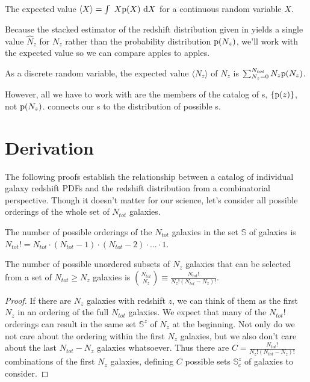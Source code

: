 \begin{definition}\label{def:expected}
	The expected value $\langle X \rangle = \int\ X\mathrm{p}(X)\ \mathrm{d} X$ for a continuous random variable $X$.
\end{definition}

Because the stacked estimator of the redshift distribution given in  yields a single value $\hat{N}_{z}$ for $N_{z}$ rather than the probability distribution $\mathrm{p}(N_{z})$, we'll work with the expected value so we can compare apples to apples.

\begin{lemma}\label{lem:expectednz}
	As a discrete random variable, the expected value $\langle N_{z} \rangle$ of $N_{z}$ is $\sum_{N_{z} = 0}^{N_{tot}} N_{z}\mathrm{p}(N_{z})$.
\end{lemma}

However, all we have to work with are the members of the catalog of \pzpdf s, $\{\mathrm{p}(z)\}$, not $\mathrm{p}(N_{z})$.
 connects our \pzpdf s to the distribution of possible \Nz s.

\section{Derivation}

The following proofs establish the relationship between a catalog of individual galaxy redshift PDFs and the redshift distribution from a combinatorial perspective.
Though it doesn't matter for our science, let's consider all possible orderings of the whole set of $N_{tot}$ galaxies.

\begin{definition}\label{def:permutations}
	The number of possible orderings of the $N_{tot}$ galaxies in the set $\mathbb{S}$ of galaxies is $N_{tot}! = N_{tot} \cdot (N_{tot} - 1) \cdot (N_{tot} - 2) \cdot \dots \cdot 1$.
\end{definition}

\begin{lemma}\label{lem:combinations}
	The number of possible unordered subsets of $N_{z}$ galaxies that can be selected from a set of $N_{tot} \geq N_{z}$ galaxies is $\binom{N_{tot}}{N_{z}} \equiv \frac{N_{tot}!}{N_{z}! (N_{tot} - N_{z})!}$.
\end{lemma}
\begin{proof}
	If there are $N_{z}$ galaxies with redshift $z$, we can think of them as the first $N_{z}$ in an ordering of the full $N_{tot}$ galaxies.
	We expect that many of the $N_{tot}!$ orderings can result in the same set $\mathbb{S}^{z}$ of $N_{z}$ at the beginning.
	Not only do we not care about the ordering within the first $N_{z}$ galaxies, but we also don't care about the last $N_{tot} - N_{z}$ galaxies whatsoever.
	Thus there are $C = \frac{N_{tot}!}{N_{z}! (N_{tot} - N_{z})!}$ combinations of the first $N_{z}$ galaxies, defining $C$ possible sets $\mathbb{S}^{z}_{c}$ of galaxies to consider.
\end{proof}

